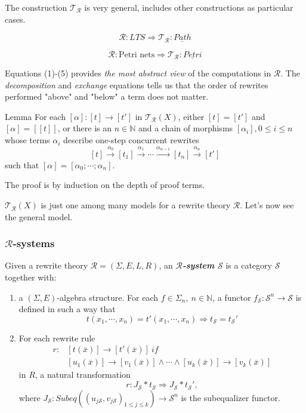 \documentclass{beamer}
\begin{document}
\begin{frame}
    \scriptsize
    The construction $\mathcal{T_R}$ is very general, includes other constructions as particular cases.

    \pause
   
    $$\mathcal{R} : LTS \Rightarrow  \mathcal{T_R} : \underline{Path}$$

    \pause
    
    $$\mathcal{R} : \text{Petri nets} \Rightarrow  \mathcal{T_R} : \underline{Petri}$$

\pause 
\bigskip
Equations (1)-(5) provides \emph{the most abstract view} of the computations in $\mathcal{R}$. The \emph{decomposition} and \emph{exchange} equations 
tells us that the order of rewrites performed "above" and "below" a term does not matter.
\pause 
\begin{block}{Lemma}
For each $[\alpha]: [t] \rightarrow [t']$ in $\mathcal{T_R}(X)$, either $[t] = [t']$ and 
$[\alpha] = [[t]]$, or there  is an $n \in \mathbb{N}$ and a chain of morphisms $[\alpha_i], 0 \le i \le n$ whose terms 
$\alpha_i$ describe one-step concurrent rewrites 
$$ [t] \xrightarrow{\alpha_0} [t_1] \xrightarrow{\alpha_1} \cdots \xrightarrow{\alpha_{n-1}} [t_n] \xrightarrow{\alpha_n} [t']$$
such that $[\alpha] = [\alpha_0;\cdots;\alpha_n].$

The proof is by induction on the depth of proof terms.
    
\end{block}
\pause 
$\mathcal{T_R}(X)$ is just one among many models for a rewrite theory $\mathcal{R}.$ Let's now see the general model.
\end{frame}
\begin{frame}
    \frametitle{$\mathcal{R}$-systems}
    \scriptsize
    Given a rewrite theory $\mathcal{R} = (\Sigma,E,L,R)$, an \emph{\textbf{$\mathcal{R}$-system $\mathcal{S}$}} is a 
    category $\mathcal{S}$ together with:
    \begin{enumerate}
        \item a $(\Sigma,E)$-algebra structure. For each $f \in \Sigma_n,\ n\in \mathbb{N}$, a functor $f_{\mathcal{S}}:\mathcal{S}^n \rightarrow \mathcal{S}$
        is defined in such a way that 
        $$t(x_1,\cdots,x_n) = t'(x_1,\cdots,x_n) \Rightarrow t_{\mathcal{S}} = t_{\mathcal{S}}'$$
        \item For each rewrite rule
        \begin{align*}
            r:&[t(\overline{x})] \rightarrow [t'(\overline{x})]\ if \\ 
            &[u_1(\overline{x})] \rightarrow [v_1(\overline{x})] \wedge \cdots \wedge [u_k(\overline{x})] \rightarrow [v_k(\overline{x})] 
            \end{align*}
        in $R$, a natural transformation 
        $$ r: J_{\mathcal{S}} * t_{\mathcal{S}} \Rightarrow J_{\mathcal{S}} * t_{\mathcal{S}}',$$
        where $J_{\mathcal{S}}:Subeq((u_{j\mathcal{S}},v_{j\mathcal{S}})_{1 \le j \le k}) \rightarrow \mathcal{S}^n$ is the subequalizer functor.
    \end{enumerate}
\end{frame}
\end{document}
